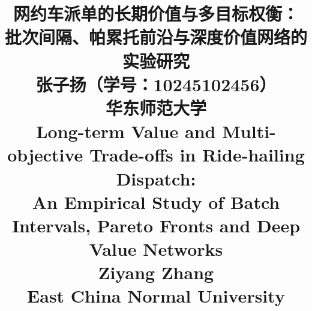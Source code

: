 \usepackage{siunitx}
\setlength{\columnsep}{0.6cm}
\captionsetup{font=small}
\setlength{\abovecaptionskip}{3pt}
\setlength{\textfloatsep}{8pt plus 2pt minus 2pt}
\setlength{\floatsep}{6pt plus 2pt minus 2pt}
\newcommand{\Dt}{\Delta t}

\title{
	\textbf{网约车派单的长期价值与多目标权衡：\\批次间隔、帕累托前沿与深度价值网络的实验研究} \\
	\vspace{0.5em} \normalsize 张子扬\quad（学号：10245102456） \\
	{\small 华东师范大学} \\
	\vspace{1em}
	\large \textbf{Long-term Value and Multi-objective Trade-offs in Ride-hailing Dispatch:} \\
	\large \textbf{An Empirical Study of Batch Intervals, Pareto Fronts and Deep Value Networks} \\
	\vspace{0.5em} \normalsize Ziyang Zhang \\
	{\small East China Normal University}
}
\date{}
\renewcommand{\refname}{参考文献}
\makeatletter\newcommand{}\makeatother
